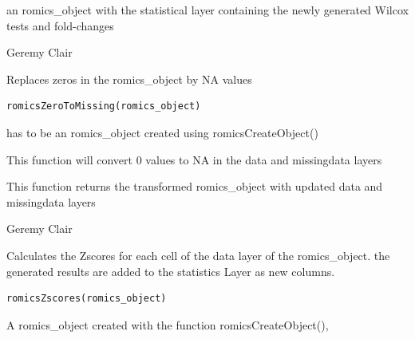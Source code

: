 \documentclass[a4paper]{book}
\begin{document}
%
\begin{Value}
an romics\_object with the statistical layer containing the newly generated Wilcox tests and fold-changes
\end{Value}
%
\begin{Author}
Geremy Clair
\end{Author}
%
\begin{Description}
Replaces zeros in the romics\_object by NA values
\end{Description}
%
\begin{Usage}
\begin{verbatim}
romicsZeroToMissing(romics_object)
\end{verbatim}
\end{Usage}
%
\begin{Arguments}
\begin{ldescription}
\item[\code{romics\_object}] has to be an romics\_object created using romicsCreateObject()
\end{ldescription}
\end{Arguments}
%
\begin{Details}
This function will convert 0 values to NA in the data and missingdata layers
\end{Details}
%
\begin{Value}
This function returns the transformed romics\_object with updated data and missingdata layers
\end{Value}
%
\begin{Author}
Geremy Clair
\end{Author}
%
\begin{Description}
Calculates the Zscores for each cell of the data layer of the romics\_object. the generated results are added to the statistics Layer as new columns.
\end{Description}
%
\begin{Usage}
\begin{verbatim}
romicsZscores(romics_object)
\end{verbatim}
\end{Usage}
%
\begin{Arguments}
\begin{ldescription}
\item[\code{romics\_object}] A romics\_object created with the function romicsCreateObject(),
\end{ldescription}
\end{Arguments}
\end{document}
